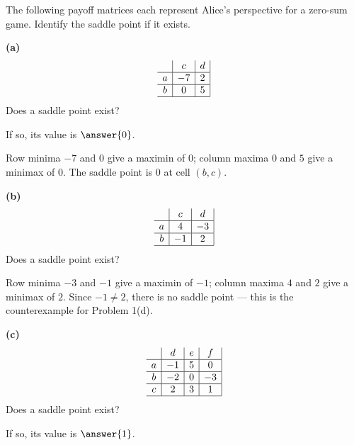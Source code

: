 \documentclass[12pt]{ximera}
\begin{document}
\begin{problem}
The following payoff matrices each represent Alice's perspective for a zero-sum game.
Identify the saddle point if it exists.

\begin{prompt}
\textbf{(a)}
\[
\begin{array}{c|c|c|}
\phantom{|} & c & d \\\hline
a & -7 & 2 \\\hline
b & 0 & 5 \\\hline
\end{array}
\]
Does a saddle point exist?
\begin{multipleChoice}
\end{multipleChoice}
If so, its value is $\answer{0}$.

\begin{feedback}
Row minima $-7$ and $0$ give a maximin of $0$; column maxima $0$ and $5$ give a minimax
of $0$. The saddle point is $0$ at cell $(b,c)$.
\end{feedback}
\end{prompt}

\begin{prompt}
\textbf{(b)}
\[
\begin{array}{c|c|c|}
\phantom{|} & c & d \\\hline
a & 4 & -3 \\\hline
b & -1 & 2 \\\hline
\end{array}
\]
Does a saddle point exist?
\begin{multipleChoice}
\end{multipleChoice}

\begin{feedback}
Row minima $-3$ and $-1$ give a maximin of $-1$; column maxima $4$ and $2$ give a minimax
of $2$. Since $-1 \neq 2$, there is no saddle point --- this is the counterexample for
Problem 1(d).
\end{feedback}
\end{prompt}

\begin{prompt}
\textbf{(c)}
\[
\begin{array}{c|c|c|c|}
\phantom{|} & d & e & f \\\hline
a & -1 & 5 & 0 \\\hline
b & -2 & 0 & -3 \\\hline
c & 2 & 3 & 1 \\\hline
\end{array}
\]
Does a saddle point exist?
\begin{multipleChoice}
\end{multipleChoice}
If so, its value is $\answer{1}$.


\end{prompt}
\end{problem}
\end{document}

